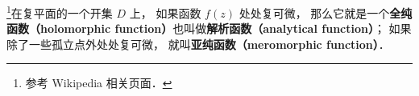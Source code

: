 
\begin{issues}
\issueDraft
\end{issues}


\footnote{参考 Wikipedia 相关页面．}在复平面的一个开集 $D$ 上， 如果函数 $f(z)$ 处处复可微， 那么它就是一个\textbf{全纯函数（holomorphic function）}也叫做\textbf{解析函数（analytical function）}； 如果除了一些孤立点外处处复可微， 就叫\textbf{亚纯函数（meromorphic function）}．
